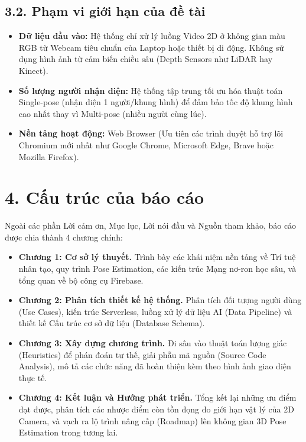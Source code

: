 \documentclass[12pt,a4paper]{report}
\begin{document}
\subsection*{3.2. Phạm vi giới hạn của đề tài}
\begin{itemize}
    \item \textbf{Dữ liệu đầu vào:} Hệ thống chỉ xử lý luồng Video 2D ở không gian màu RGB từ Webcam tiêu chuẩn của Laptop hoặc thiết bị di động. Không sử dụng hình ảnh từ cảm biến chiều sâu (Depth Sensors như LiDAR hay Kinect).
    \item \textbf{Số lượng người nhận diện:} Hệ thống tập trung tối ưu hóa thuật toán Single-pose (nhận diện 1 người/khung hình) để đảm bảo tốc độ khung hình cao nhất thay vì Multi-pose (nhiều người cùng lúc).
    \item \textbf{Nền tảng hoạt động:} Web Browser (Ưu tiên các trình duyệt hỗ trợ lõi Chromium mới nhất như Google Chrome, Microsoft Edge, Brave hoặc Mozilla Firefox).
\end{itemize}

\section*{4. Cấu trúc của báo cáo}
Ngoài các phần Lời cảm ơn, Mục lục, Lời nói đầu và Nguồn tham khảo, báo cáo được chia thành 4 chương chính:
\begin{itemize}
    \item \textbf{Chương 1: Cơ sở lý thuyết.} Trình bày các khái niệm nền tảng về Trí tuệ nhân tạo, quy trình Pose Estimation, các kiến trúc Mạng nơ-ron học sâu, và tổng quan về bộ công cụ Firebase.
    \item \textbf{Chương 2: Phân tích thiết kế hệ thống.} Phân tích đối tượng người dùng (Use Cases), kiến trúc Serverless, luồng xử lý dữ liệu AI (Data Pipeline) và thiết kế Cấu trúc cơ sở dữ liệu (Database Schema).
    \item \textbf{Chương 3: Xây dựng chương trình.} Đi sâu vào thuật toán lượng giác (Heuristics) để phán đoán tư thế, giải phẫu mã nguồn (Source Code Analysis), mô tả các chức năng đã hoàn thiện kèm theo hình ảnh giao diện thực tế.
    \item \textbf{Chương 4: Kết luận và Hướng phát triển.} Tổng kết lại những ưu điểm đạt được, phân tích các nhược điểm còn tồn đọng do giới hạn vật lý của 2D Camera, và vạch ra lộ trình nâng cấp (Roadmap) lên không gian 3D Pose Estimation trong tương lai.
\end{itemize}
\end{document}
